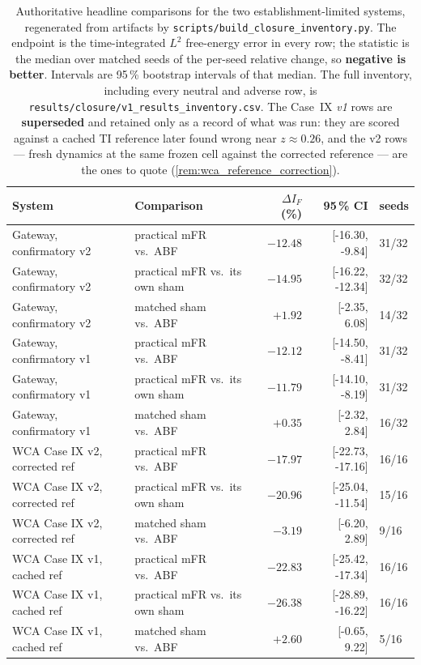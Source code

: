 \begin{table}[t]
\centering
\footnotesize
\caption{Authoritative headline comparisons for the two establishment-limited systems, regenerated from artifacts by \texttt{scripts/build\_closure\_inventory.py}. The endpoint is the time-integrated $L^2$ free-energy error in every row; the statistic is the median over matched seeds of the per-seed relative change, so \textbf{negative is better}. Intervals are 95\,\% bootstrap intervals of that median. The full inventory, including every neutral and adverse row, is \texttt{results/closure/v1\_results\_inventory.csv}. The Case~IX \emph{v1} rows are \textbf{superseded} and retained only as a record of what was run: they are scored against a cached TI reference later found wrong near $z\approx0.26$, and the v2 rows --- fresh dynamics at the same frozen cell against the corrected reference --- are the ones to quote (\cref{rem:wca_reference_correction}).}
\label{tab:closure_inventory}
\begin{tabular}{llrrl}
\toprule
System & Comparison & $\Delta I_F$ (\%) & 95\,\% CI & seeds \\
\midrule
Gateway, confirmatory v2 & practical mFR vs.\ ABF & $-12.48$ & [-16.30, -9.84] & 31/32 \\
Gateway, confirmatory v2 & practical mFR vs.\ its own sham & $-14.95$ & [-16.22, -12.34] & 32/32 \\
Gateway, confirmatory v2 & matched sham vs.\ ABF & $+1.92$ & [-2.35, 6.08] & 14/32 \\
Gateway, confirmatory v1 & practical mFR vs.\ ABF & $-12.12$ & [-14.50, -8.41] & 31/32 \\
Gateway, confirmatory v1 & practical mFR vs.\ its own sham & $-11.79$ & [-14.10, -8.19] & 31/32 \\
Gateway, confirmatory v1 & matched sham vs.\ ABF & $+0.35$ & [-2.32, 2.84] & 16/32 \\
WCA Case IX v2, corrected ref & practical mFR vs.\ ABF & $-17.97$ & [-22.73, -17.16] & 16/16 \\
WCA Case IX v2, corrected ref & practical mFR vs.\ its own sham & $-20.96$ & [-25.04, -11.54] & 15/16 \\
WCA Case IX v2, corrected ref & matched sham vs.\ ABF & $-3.19$ & [-6.20, 2.89] & 9/16 \\
WCA Case IX v1, cached ref & practical mFR vs.\ ABF & $-22.83$ & [-25.42, -17.34] & 16/16 \\
WCA Case IX v1, cached ref & practical mFR vs.\ its own sham & $-26.38$ & [-28.89, -16.22] & 16/16 \\
WCA Case IX v1, cached ref & matched sham vs.\ ABF & $+2.60$ & [-0.65, 9.22] & 5/16 \\
\bottomrule
\end{tabular}
\end{table}
